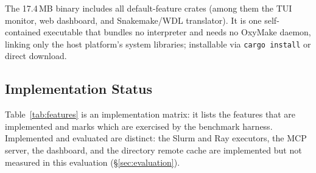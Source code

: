 \documentclass[12pt,a4paper]{article}
\newcommand{\code}[1]{{\texttt{\small\color{inlinecode}#1}}}
\begin{document}
\noindent The 17.4\,MB binary includes all default-feature crates
(among them the TUI monitor, web dashboard, and Snakemake/WDL translator). It is
one self-contained executable that bundles no interpreter and needs no
OxyMake daemon, linking only the host platform's system libraries;
installable via \code{cargo install} or direct download.

\subsection{Implementation Status}
\label{sec:feature-matrix}

Table~\ref{tab:features} is an implementation matrix: it lists the
features that are implemented and marks which are exercised by the
benchmark harness. Implemented and evaluated are distinct: the Slurm
and Ray executors, the MCP server, the dashboard, and the directory
remote cache are implemented but not measured in this evaluation
(\S\ref{sec:evaluation}).
\end{document}
